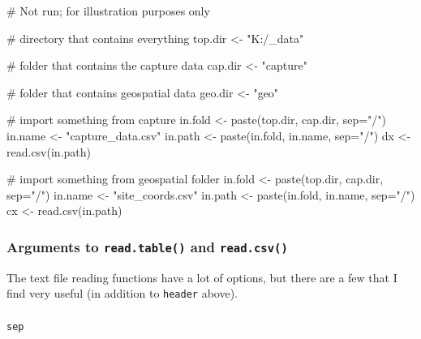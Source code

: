 \documentclass[
  13,
  letterpaper,
]{report}
\makeatletter
\let\oldparagraph\paragraph
\renewcommand{\paragraph}{
    \@ifstar
      \xxxParagraphStar
      \xxxParagraphNoStar
  }
\newcommand{\xxxParagraphStar}[1]{\oldparagraph*{#1}\mbox{}}
\newcommand{\xxxParagraphNoStar}[1]{\oldparagraph{#1}\mbox{}}
\newenvironment{Shaded}{\begin{snugshade}}{\end{snugshade}}
\newcommand{\AttributeTok}[1]{\textcolor[rgb]{0.40,0.45,0.13}{#1}}
\newcommand{\CommentTok}[1]{\textcolor[rgb]{0.37,0.37,0.37}{#1}}
\newcommand{\FunctionTok}[1]{\textcolor[rgb]{0.28,0.35,0.67}{#1}}
\newcommand{\NormalTok}[1]{\textcolor[rgb]{0.00,0.23,0.31}{#1}}
\newcommand{\OtherTok}[1]{\textcolor[rgb]{0.00,0.23,0.31}{#1}}
\newcommand{\StringTok}[1]{\textcolor[rgb]{0.13,0.47,0.30}{#1}}
\makeatother
\begin{document}
\begin{Shaded}
\begin{Highlighting}[]
\CommentTok{\# Not run; for illustration purposes only}

\CommentTok{\# directory that contains everything}
\NormalTok{top.dir }\OtherTok{\textless{}{-}} \StringTok{"K:/\_data"}

\CommentTok{\# folder that contains the capture data}
\NormalTok{cap.dir }\OtherTok{\textless{}{-}} \StringTok{"capture"}

\CommentTok{\# folder that contains geospatial data}
\NormalTok{geo.dir }\OtherTok{\textless{}{-}} \StringTok{"geo"}

\CommentTok{\# import something from capture}
\NormalTok{in.fold }\OtherTok{\textless{}{-}} \FunctionTok{paste}\NormalTok{(top.dir, cap.dir, }\AttributeTok{sep=}\StringTok{"/"}\NormalTok{)}
\NormalTok{in.name }\OtherTok{\textless{}{-}} \StringTok{"capture\_data.csv"}
\NormalTok{in.path }\OtherTok{\textless{}{-}} \FunctionTok{paste}\NormalTok{(in.fold, in.name, }\AttributeTok{sep=}\StringTok{"/"}\NormalTok{)}
\NormalTok{dx }\OtherTok{\textless{}{-}} \FunctionTok{read.csv}\NormalTok{(in.path)}

\CommentTok{\# import something from geospatial folder}
\NormalTok{in.fold }\OtherTok{\textless{}{-}} \FunctionTok{paste}\NormalTok{(top.dir, cap.dir, }\AttributeTok{sep=}\StringTok{"/"}\NormalTok{)}
\NormalTok{in.name }\OtherTok{\textless{}{-}} \StringTok{"site\_coords.csv"}
\NormalTok{in.path }\OtherTok{\textless{}{-}} \FunctionTok{paste}\NormalTok{(in.fold, in.name, }\AttributeTok{sep=}\StringTok{"/"}\NormalTok{)}
\NormalTok{cx }\OtherTok{\textless{}{-}} \FunctionTok{read.csv}\NormalTok{(in.path)}
\end{Highlighting}
\end{Shaded}

\subsubsection{\texorpdfstring{Arguments to \texttt{read.table()} and
\texttt{read.csv()}}{Arguments to read.table() and read.csv()}}\label{sec-ie-import-text-args}

The text file reading functions have a lot of options, but there are a
few that I find very useful (in addition to \texttt{header} above).

\paragraph{\texorpdfstring{\texttt{sep}}{sep}}\label{sep}
\end{document}
